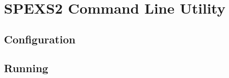 \chapter{SPEXS2 Command Line Utility}
\label{add:spexs2}


\section{Configuration}


\section{Running}

